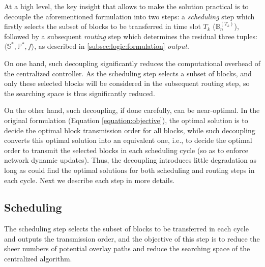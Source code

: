 At a high level, the key insight that allows \name to make the solution practical is
to decouple the aforementioned formulation into two steps:
a {\em scheduling} step which firstly selects the subset of blocks to be transferred in time slot $T_k$
($\mathbb{B}^{(T_k)}_n$), followed by a subsequent {\em routing}
step which determines the residual three tuples: $\langle \mathbb{S}^*, \mathbb{P}^*, f \rangle$, as described in \Section\ref{subsec:logic:formulation} {\em output}.

On one hand, such decoupling significantly reduces the computational overhead of the centralized controller. As the scheduling step selects a subset of blocks, and only these selected blocks will be considered in the subsequent routing step, so the searching space is thus significantly reduced.



On the other hand, such decoupling, if done carefully, can be near-optimal. In the original formulation (Equation \ref{equation:objective}), the optimal solution is to decide the optimal block transmission order for all blocks, while such decoupling converts this optimal solution into an equivalent one, i.e., to decide the optimal order to transmit the selected blocks in each scheduling cycle (so as to enforce network dynamic updates). Thus, the decoupling introduces little degradation as long as \name could find the optimal solutions for both scheduling and routing steps in each cycle. Next we describe each step in more details.


\subsection{Scheduling}
\label{subsec:logic:scheduling}

The scheduling step
selects the subset of blocks to be transferred in each cycle and
outputs the transmission order, and the objective of this step is to reduce the sheer numbers of potential overlay paths and reduce the searching space of the centralized algorithm.


